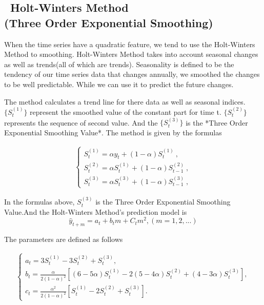 \documentclass[12pt]{article}
\begin{document}
\subsection{\ Holt-Winters Method \\(Three Order Exponential Smoothing)
}


When the time series have a quadratic feature, we tend to use the Holt-Winters Method to smoothing. Holt-Winters Method takes into account seasonal changes as well as trends(all of which are trends). Seasonality is defined to be the tendency of our time series data that  changes  annually, we  smoothed the changes to be well predictable. While we can use it to predict the future changes.

The method calculates a trend line for there data as well as seasonal indices. $\{S_t^{(1)}\}$ represent the smoothed value of the constant part for time t. $\{S_t^{(2)}\}$ represents the sequence of second value. And the $\{S_t^{(3)}\}$ is the *Three Order Exponential Smoothing Value*. The method is given by the formulas 

\begin{eqnarray}
\left\{
\begin{array}{ll}
 S^{(1)}_t=\alpha y_t+(1-\alpha)S_t^{(1)}  \  , \\
 S^{(2)}_t=\alpha S^{(1)}_t +(1-\alpha)S_{t-1}^{(2)} \  ,\\
 S^{(3)}_t = \alpha S^{(3)}_t +(1-\alpha)S^{(3)}_{t-1}\ ,
\end{array}\right.\label{equ:dynamicofcollision}
\end{eqnarray}

 In the formulas above, $S^{(3)}_t$ is the Three Order Exponential Smoothing Value.And the Holt-Winters Method's prediction model is
$$
\hat y_{t+m} = a_t + b_tm + C_t m^2, (m = 1,2,...)
$$

The parameters are defined as follows

\begin{eqnarray}
\left \{
  \begin{array}{ll}
  a_t = 3S_t^{(1)} - 3S_t^{(2)} +S_t^{(3)}, \\
  b_t = \frac{\alpha}{2(1-\alpha)^2}[(6-5\alpha)S_t^{(1)} - 2(5-4\alpha)S_t^{(2)}+(4-3\alpha)S_t^{(3)}], \\
  c_t=\frac{\alpha^2}{2(1-\alpha)^2}[S_t^{(1)}-2S_t^{(2)}+S_t^{(3)}].
 
\end{array} \right .
\end{eqnarray}
\end{document}
